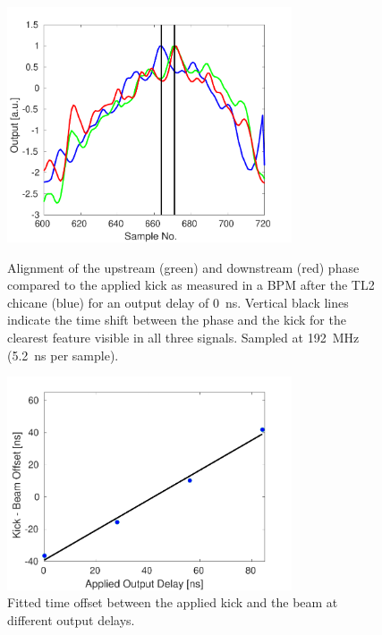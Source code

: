\begin{figure}
  \centering
  \includegraphics[width=0.75\textwidth]{Figures/commissioning/absTimBeam_d0}
  \caption{Alignment of the upstream (green) and downstream (red) phase compared to the applied kick as measured in a BPM after the TL2 chicane (blue) for an output delay of 0~ns. Vertical black lines indicate the time shift between the phase and the kick for the clearest feature visible in all three signals. Sampled at 192~MHz (5.2~ns per sample).}
  \label{f:absTimBeam_d0}
  \includegraphics[width=0.75\textwidth]{Figures/commissioning/absTimBeam_fit}
  \caption{Fitted time offset between the applied kick and the beam at different output delays.}
  \label{f:absTimBeam_fit}
\end{figure}

